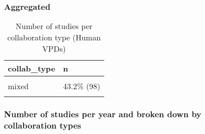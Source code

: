 \documentclass[
]{article}
\begin{document}
\hypertarget{aggregated}{%
\subsubsection{Aggregated}\label{aggregated}}

\begin{table}[H]

\caption{\label{tab:unnamed-chunk-6}Number of studies per collaboration type (Human VPDs)}
\centering
\begin{tabular}[t]{ll}
\toprule
collab\_type & n\\
\midrule
\cellcolor{gray!6}{purely\_academic} & \cellcolor{gray!6}{56.8\% (129)}\\
mixed & 43.2\%  (98)\\
\cellcolor{gray!6}{Total} & \cellcolor{gray!6}{100.0\% (227)}\\
\bottomrule
\end{tabular}
\end{table}

\hypertarget{number-of-studies-per-year-and-broken-down-by-collaboration-types}{%
\subsubsection{Number of studies per year and broken down by
collaboration
types}\label{number-of-studies-per-year-and-broken-down-by-collaboration-types}}
\end{document}
